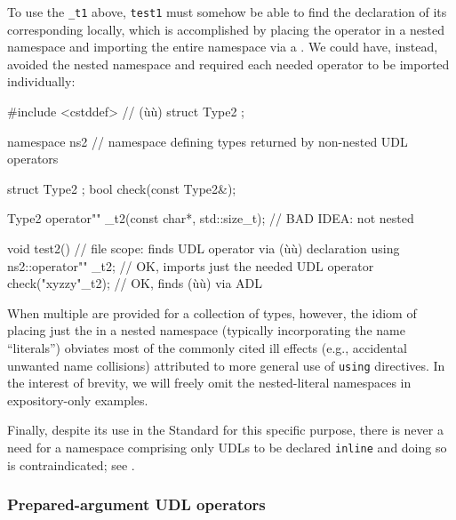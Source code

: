 \noindent To use the \lstinline!_t1!  above, \lstinline!test1! must
somehow be able to find the declaration of its corresponding  locally, which is accomplished by placing the operator in a
nested namespace and importing the entire namespace via a . We could have, instead, avoided the nested namespace and
required each needed operator to be imported individually:

\begin{emcppshiddenlisting}[emcppsbatch=e9]
#include <cstddef>  // (ù{}ù)
struct Type2 {};
\end{emcppshiddenlisting}
\begin{emcppslisting}[emcppsbatch=e9]
namespace ns2  // namespace defining types returned by non-nested UDL operators
{
    struct Type2 { };
    bool check(const Type2&);

    Type2 operator"" _t2(const char*, std::size_t);  // BAD IDEA: not nested
}

void test2()  // file scope: finds UDL operator via (ù{}ù) declaration
{
    using ns2::operator"" _t2;  // OK, imports just the needed UDL operator
    check("xyzzy"_t2);          // OK, finds (ù{}ù) via ADL
}
\end{emcppslisting}
    
\noindent When multiple  are provided for a collection of
types, however, the idiom of placing just the  in
a nested namespace (typically incorporating the name ``literals'')
obviates most of the commonly cited ill effects (e.g., accidental
unwanted name collisions) attributed to more general use of
\lstinline!using! directives. In the interest of brevity, we will freely
omit the nested-literal namespaces in expository-only examples.

Finally, despite its use in the Standard for this specific purpose,
there is never a need for a namespace comprising only UDLs to be
declared \lstinline!inline! and doing so is contraindicated; see .

\subsubsection[Prepared-argument UDL operators]{Prepared-argument UDL operators}\label{prepared-argument-udl-operators}

